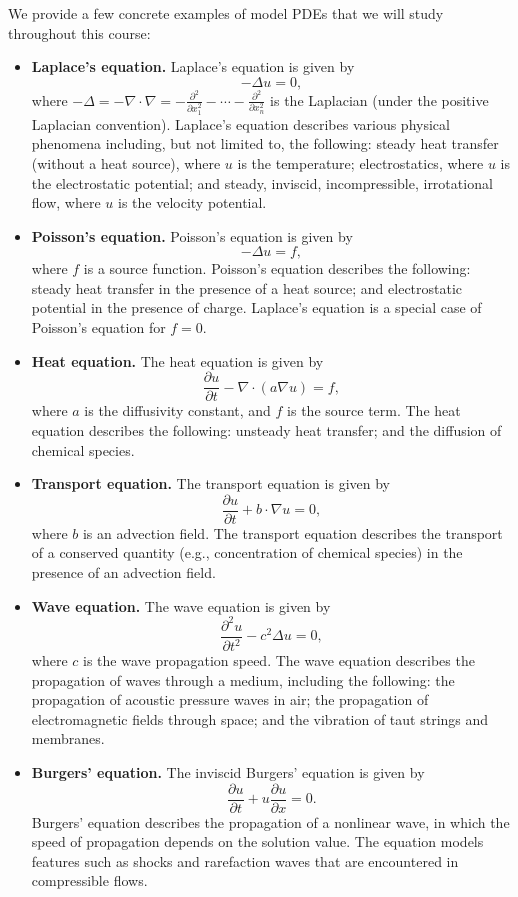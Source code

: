 We provide a few concrete examples of model PDEs that we will study throughout this course:
\begin{itemize}
    \item \textbf{Laplace's equation.} Laplace's equation is given by
    \[-\Delta u = 0,\]
    where $-\Delta = -\nabla \cdot \nabla = -\frac{\partial^2}{\partial x_1^2} - \cdots - \frac{\partial^2}{\partial x_n^2}$ is the Laplacian (under the positive Laplacian convention). Laplace's equation describes various physical phenomena including, but not limited to, the following: steady heat transfer (without a heat source), where $u$ is the temperature; electrostatics, where $u$ is the electrostatic potential; and steady, inviscid, incompressible, irrotational flow, where $u$ is the velocity potential.
    \item \textbf{Poisson's equation.} Poisson's equation is given by
    \[-\Delta u = f,\]
    where $f$ is a source function. Poisson's equation describes the following: steady heat transfer in the presence of a heat source; and electrostatic potential in the presence of charge. Laplace's equation is a special case of Poisson's equation for $f = 0$.
    \item \textbf{Heat equation.} The heat equation is given by
    \[\frac{\partial u}{\partial t} - \nabla \cdot (a \nabla u) = f,\]
    where $a$ is the diffusivity constant, and $f$ is the source term. The heat equation describes the following: unsteady heat transfer; and the diffusion of chemical species.
    \item \textbf{Transport equation.} The transport equation is given by
    \[\frac{\partial u}{\partial t} + b \cdot \nabla u = 0,\]
    where $b$ is an advection field. The transport equation describes the transport of a conserved quantity (e.g., concentration of chemical species) in the presence of an advection field.
    \item \textbf{Wave equation.} The wave equation is given by
    \[\frac{\partial^2 u}{\partial t^2} - c^2 \Delta u = 0,\]
    where $c$ is the wave propagation speed. The wave equation describes the propagation of waves through a medium, including the following: the propagation of acoustic pressure waves in air; the propagation of electromagnetic fields through space; and the vibration of taut strings and membranes.
    \item \textbf{Burgers' equation.} The inviscid Burgers' equation is given by
    \[\frac{\partial u}{\partial t} + u \frac{\partial u}{\partial x} = 0.\]
    Burgers' equation describes the propagation of a nonlinear wave, in which the speed of propagation depends on the solution value. The equation models features such as shocks and rarefaction waves that are encountered in compressible flows.
\end{itemize}

